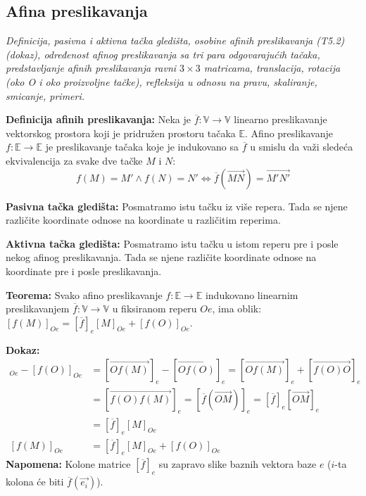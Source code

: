 \documentclass[12pt]{article}
\newcommand{\vek}[1]{\overrightarrow{#1}}
\begin{document}
\subsection{Afina preslikavanja}
\textit{Definicija, pasivna i aktivna tačka gledišta, osobine afinih
    preslikavanja (T5.2) (dokaz), određenost afinog preslikavanja sa tri para
    odgovarajućih tačaka, predstavljanje afinih preslikavanja ravni $3\times3$
    matricama, translacija, rotacija (oko O i oko proizvoljne tačke),
    refleksija u odnosu na pravu, skaliranje, smicanje, primeri.}
\par
\vspace*{1cm}

\textbf{Definicija afinih preslikavanja:} Neka je
$\overline{f}: \mathbb{V}\rightarrow\mathbb{V}$ linearno preslikavanje
vektorskog prostora koji je pridružen prostoru tačaka $\mathbb{E}$. Afino
preslikavanje $f: \mathbb{E}\rightarrow\mathbb{E}$ je preslikavanje tačaka koje
je indukovano sa $\overline{f}$ u smislu da važi sledeća ekvivalencija za svake
dve tačke $M$ i $N$:
$$f(M)=M'\land f(N)=N' \iff \overline{f}(\vek{MN})=\vek{M'N'}$$
\par

\textbf{Pasivna tačka gledišta:} Posmatramo istu tačku iz više repera. Tada se
njene različite koordinate odnose na koordinate u različitim reperima.
\par

\textbf{Aktivna tačka gledišta:} Posmatramo istu tačku u istom reperu pre i
posle nekog afinog preslikavanja. Tada se njene različite koordinate odnose na
koordinate pre i posle preslikavanja.

\textbf{Teorema:} Svako afino preslikavanje
$f:\mathbb{E}\rightarrow\mathbb{E}$ indukovano linearnim preslikavanjem
$\overline{f}:\mathbb{V}\rightarrow\mathbb{V}$ u fiksiranom reperu $Oe$, ima
oblik: $[f(M)]_{Oe}=[\overline{f}]_{e}[M]_{Oe}+[f(O)]_{Oe}$.
\par
\textbf{Dokaz:}
\begin{align*}
    [f(M)]_{Oe}-[f(O)]_{Oe} & =[\vek{Of(M)}]_e-[\vek{Of(O)}]_e
    =[\vek{Of(M)}]_e+[\vek{f(O)O}]_e                                         \\
                            & =[\vek{f(O)f(M)}]_e=[\overline{f}(\vek{OM})]_e
    =[\overline{f}]_e[\vek{OM}]_e                                            \\
                            & =[\overline{f}]_e[M]_{Oe}                      \\
    [f(M)]_{Oe}             & =[\overline{f}]_{e}[M]_{Oe}+[f(O)]_{Oe}
\end{align*}
\textbf{Napomena:} Kolone matrice $[\overline{f}]_e$ su zapravo slike baznih
vektora baze $e$ ($i$-ta kolona će biti $\overline{f}(\vek{e_i})$).
\par
\end{document}
